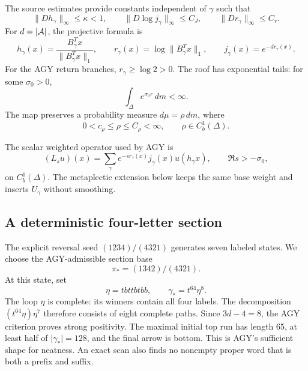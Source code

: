 The source estimates provide constants independent of \(\gamma\) such that
\begin{equation}
 \|Dh_\gamma\|_\infty\le\kappa<1,
 \qquad
 \|D\log j_\gamma\|_\infty\le C_J,
 \qquad
 \|Dr_\gamma\|_\infty\le C_r.
 \label{eq:agy-bounds}
\end{equation}
For \(d=|\mathcal A|\), the projective formula is
\begin{equation}
 h_\gamma(x)=\frac{B_\gamma^Tx}{\|B_\gamma^Tx\|_1},
 \qquad
 r_\gamma(x)=\log\|B_\gamma^Tx\|_1,
 \qquad
 j_\gamma(x)=e^{-d r_\gamma(x)}.
 \label{eq:branch-formula}
\end{equation}
For the AGY return branches, \(r_\gamma\ge\log2>0\).
The roof has exponential tails: for some \(\sigma _0>0\),
\begin{equation}
 \int_\Delta e^{\sigma _0r}\,dm<\infty.
 \label{eq:tails}
\end{equation}
The map preserves a probability measure \(d\mu=\rho\,dm\), where
\begin{equation}
 0<c_\rho\le\rho\le C_\rho<\infty,
 \qquad \rho\in C_b^1(\Delta).
 \label{eq:density}
\end{equation}

The scalar weighted operator used by AGY is
\begin{equation}
 (L_su)(x)=\sum_\gamma
 e^{-sr_\gamma(x)}j_\gamma(x)u(h_\gamma x),
 \qquad \Re s>-\sigma _0,
 \label{eq:agy-transfer}
\end{equation}
on \(C_b^1(\Delta)\).  The metaplectic extension below keeps the same base
weight and inserts \(U_\gamma\) without smoothing.

\subsection{A deterministic four-letter section}

The explicit reversal seed \((1234)/(4321)\) generates seven labeled states.
We choose the AGY-admissible section base
\[
 \pi_*=(1342)/(4321).
\]
At this state, set
\begin{equation}
 \eta=tbttbtbb,
 \qquad
 \gamma_*=t^{64}\eta^8.
 \label{eq:gamma-star}
\end{equation}
The loop \(\eta\) is complete: its winners contain all four labels.  The
decomposition \((t^{64}\eta)\eta^7\) therefore consists of eight complete
paths.  Since \(3d-4=8\), the AGY criterion proves strong positivity.  The
maximal initial top run has length 65, at least half of
\(|\gamma_*|=128\), and the final arrow is bottom.  This is AGY's sufficient
shape for neatness.  An exact scan also finds no nonempty proper word that
is both a prefix and suffix.

